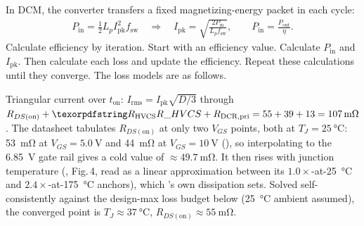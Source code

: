 In DCM, the converter transfers a fixed magnetizing-energy packet in each
cycle:
\begin{align*}
  P_{\mathrm{in}} = \tfrac{1}{2} L_p I_{\mathrm{pk}}^2 f_{\mathrm{sw}}
  \quad\Longrightarrow\quad
  I_{\mathrm{pk}} = \sqrt{\frac{2 P_{\mathrm{in}}}{L_p f_{\mathrm{sw}}}},
  \qquad
  P_{\mathrm{in}} = \frac{P_{\mathrm{out}}}{\eta}.
\end{align*}
Calculate efficiency by iteration. Start with an efficiency value. Calculate
$P_{\mathrm{in}}$ and $I_{\mathrm{pk}}$. Then calculate each loss and update
the efficiency. Repeat these calculations until they converge. The loss models
are as follows.
\begin{description}[style=nextline]
  \item[Primary conduction] Triangular current over $t_{\mathrm{on}}$:
    $I_{\mathrm{rms}} = I_{\mathrm{pk}}\sqrt{D/3}$ through
    $R_{DS(\mathrm{on})} + \des{R}{HVCS} + R_{\mathrm{DCR,pri}}
     = 55 + 39 + 13 = \SI{107}{\milli\ohm}$. The datasheet tabulates
    $R_{DS(\mathrm{on})}$ at only two $V_{GS}$ points, both at
    $T_J=\SI{25}{\celsius}$: \SI{53}{\milli\ohm} at $V_{GS}=\SI{5.0}{\volt}$ and
    \SI{44}{\milli\ohm} at $V_{GS}=\SI{10}{\volt}$
    (), so interpolating to the
    \SI{6.85}{\volt} gate rail gives a cold value of
    $\approx\SI{49.7}{\milli\ohm}$. It then rises with junction temperature
    (, Fig.\,4, read as a linear
    approximation between its $1.0\times$-at-\SI{25}{\celsius} and
    $2.4\times$-at-\SI{175}{\celsius} anchors), which 's own
    dissipation sets. Solved self-consistently against the design-max loss
    budget below (\SI{25}{\celsius} ambient assumed), the converged point is
    $T_J \approx \SI{37}{\celsius}$, $R_{DS(\mathrm{on})} \approx
    \SI{55}{\milli\ohm}$.


\end{description}
